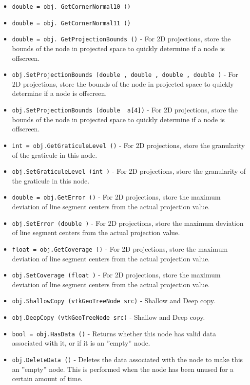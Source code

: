 \begin{itemize}
\item  \verb|double = obj. GetCornerNormal10 ()|

\item  \verb|double = obj. GetCornerNormal11 ()|

\item  \verb|double = obj. GetProjectionBounds ()| -  For 2D projections, store the bounds of the node in projected space
 to quickly determine if a node is offscreen.

\item  \verb|obj.SetProjectionBounds (double , double , double , double )| -  For 2D projections, store the bounds of the node in projected space
 to quickly determine if a node is offscreen.

\item  \verb|obj.SetProjectionBounds (double  a[4])| -  For 2D projections, store the bounds of the node in projected space
 to quickly determine if a node is offscreen.

\item  \verb|int = obj.GetGraticuleLevel ()| -  For 2D projections, store the granularity of the graticule in this node.

\item  \verb|obj.SetGraticuleLevel (int )| -  For 2D projections, store the granularity of the graticule in this node.

\item  \verb|double = obj.GetError ()| -  For 2D projections, store the maximum deviation of line segment centers
 from the actual projection value.

\item  \verb|obj.SetError (double )| -  For 2D projections, store the maximum deviation of line segment centers
 from the actual projection value.

\item  \verb|float = obj.GetCoverage ()| -  For 2D projections, store the maximum deviation of line segment centers
 from the actual projection value.

\item  \verb|obj.SetCoverage (float )| -  For 2D projections, store the maximum deviation of line segment centers
 from the actual projection value.

\item  \verb|obj.ShallowCopy (vtkGeoTreeNode src)| -  Shallow and Deep copy.

\item  \verb|obj.DeepCopy (vtkGeoTreeNode src)| -  Shallow and Deep copy.

\item  \verb|bool = obj.HasData ()| -  Returns whether this node has valid data associated
 with it, or if it is an ''empty'' node.

\item  \verb|obj.DeleteData ()| -  Deletes the data associated with the node to make this
 an ''empty'' node. This is performed when the node has
 been unused for a certain amount of time.

\end{itemize}
